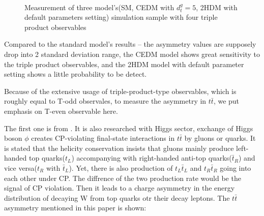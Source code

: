 			\FloatBarrier
			\begin{figure}[H]
			\centering
			    \\
			\caption{Measurement of three model's(SM, CEDM with $d_t^g=5$, 2HDM with default parameters setting) simulation sample with four triple product observables}
			\label{Obs:fig:TP_3model}
			\end{figure}
			\FloatBarrier

			Compared to the standard model's results -- the asymmetry values are supposely drop into 2 standard deviation range, the CEDM model shows great sensitivity to the triple product observables, and the 2HDM model with default parameter setting shows a little probability to be detect.

			Because of the extensive usage of triple-product-type observables, which is roughly equal to T-odd observales, to measure the asymmetry in $t\bar{t}$, we put emphasis on T-even observable here. 

			The first one is from \cite{PhysRevLett.69.410}. It is also researched with Higgs sector, exchange of Higgs boson $\phi$ creates CP-violating final-state interactions in $t\bar{t}$ by gluons or quarks. It is stated that the helicity conservation insists that gluons mainly produce left-handed top quarks($t_L$) accompanying with right-handed anti-top quarks($\bar{t}_R$) and vice versa($t_R$ with $\bar{t}_L$). Yet, there is also production of $t_L \bar{t}_L$ and $t_R \bar{t}_R$ going into each other under CP. The diffrence of the two production rate would be the signal of CP violation. Then it leads to a charge asymmetry in the energy distribution of decaying W from top quarks otr their decay leptons. The $t\bar{t}$ asymmetry mentioned in this paper is shown:

